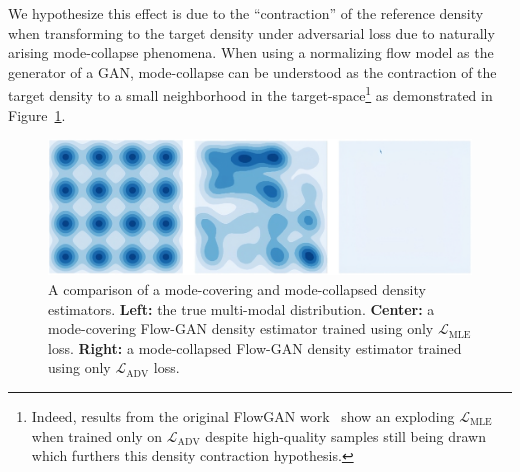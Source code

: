 We hypothesize this effect is due to the ``contraction'' of the reference density when transforming to the target
density under adversarial loss due to naturally arising mode-collapse phenomena.
When using a normalizing flow model as the generator of a GAN, mode-collapse can be understood as the
contraction of the target density to a small neighborhood in the target-space\footnote{
    Indeed, results from the original FlowGAN work~\cite{flow_gan} show an exploding $\mathcal{L}_{\text{MLE}}$ when
    trained only on $\mathcal{L}_{\text{ADV}}$ despite high-quality samples still being drawn which furthers this
    density contraction hypothesis.
} as demonstrated in Figure~\ref{fig:mode_collapse}.

\begin{figure}[htbp]
    \caption[Mode-covering and mode-collapsed density estimators on synthetic data]{
        A comparison of a mode-covering and mode-collapsed density estimators.
        \textbf{Left:} the true multi-modal distribution.
        \textbf{Center:} a mode-covering Flow-GAN density estimator trained using only $\mathcal{L}_{\text{MLE}}$ loss.
        \textbf{Right:} a mode-collapsed Flow-GAN density estimator trained using only $\mathcal{L}_{\text{ADV}}$ loss.
    }
    \begin{center}
        \setlength{\fboxsep}{0pt}%
        \setlength{\fboxrule}{1pt}%
        \includegraphics[width=120mm]{figs/mode-collapse}
    \end{center}
    \label{fig:mode_collapse}
\end{figure}

